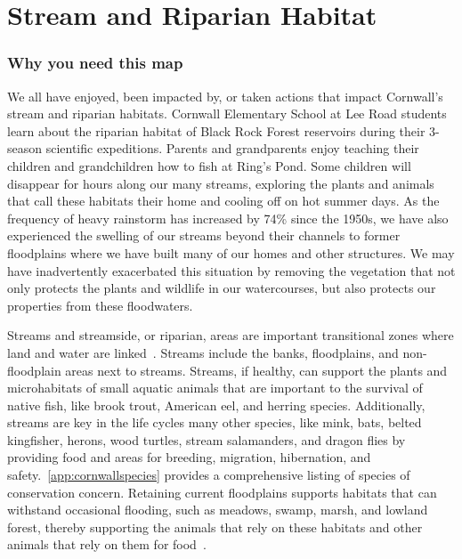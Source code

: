 \chapter{Stream and Riparian Habitat}\label{subsec:streamandriparianhabitat}
\subsection*{Why you need this map}
We all have enjoyed, been impacted by, or taken actions that impact Cornwall's
stream and riparian habitats. Cornwall Elementary School at Lee Road students
learn about the riparian habitat of Black Rock Forest reservoirs during their
3-season scientific expeditions. Parents and grandparents enjoy teaching their
children and grandchildren how to fish at Ring’s Pond. Some children will
disappear for hours along our many streams, exploring the plants and animals
that call these habitats their home and cooling off on hot summer days. As the
frequency of heavy rainstorm has increased by 74\% since the 1950s, we have
also experienced the swelling of our streams beyond their channels to former
floodplains where we have built many of our homes and other structures. We may
have inadvertently exacerbated this situation by removing the vegetation that
not only protects the plants and wildlife in our watercourses, but also
protects our properties from these floodwaters.

Streams and streamside, or riparian, areas are important transitional zones
where land and water are linked~\citep{haeckel2014}. Streams include the banks,
floodplains, and non-floodplain areas next to streams. Streams, if healthy, can
support the plants and microhabitats of small aquatic animals that are
important to the survival of native fish, like brook trout, American eel, and
herring species. Additionally, streams are key in the life cycles many other
species, like mink, bats, belted kingfisher, herons, wood turtles, stream
salamanders, and dragon flies by providing food and areas for breeding,
migration, hibernation, and safety.~\ref{app:cornwallspecies}
provides a comprehensive listing of species of conservation concern. Retaining
current floodplains supports habitats that can withstand occasional flooding,
such as meadows, swamp, marsh, and lowland forest, thereby supporting the
animals that rely on these habitats and other animals that rely on them for
food~\citep{haeckel2014}.

